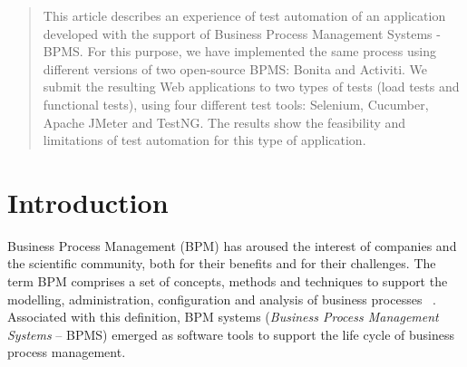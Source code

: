 \documentclass[runningheads,a4paper]{llncs}
\newcommand{\keywords}[1]{\par\addvspace\baselineskip
\noindent\keywordname\enspace\ignorespaces#1}
\begin{document}
\begin{abstract}
This article describes an experience of test automation of an application developed with the support of Business Process Management Systems - BPMS. For this purpose, we have implemented the same process using different versions of two open-source BPMS: Bonita and Activiti. We submit the resulting Web applications to two types of tests (load tests and functional tests), using four different test tools: Selenium, Cucumber, Apache JMeter and TestNG. The results show the feasibility and limitations of test automation for this type of application.

\end{abstract}


\section{Introduction}


Business Process Management (BPM) has aroused the interest of companies and the scientific community, both for their benefits and for their challenges. The term BPM comprises a set of concepts, methods and techniques to support the modelling, administration, configuration and analysis of business processes  ~\cite{weske}. Associated with this definition, BPM systems (\emph{Business Process Management Systems} -- BPMS) emerged as software tools to support the life cycle of business process management.

\end{document}
